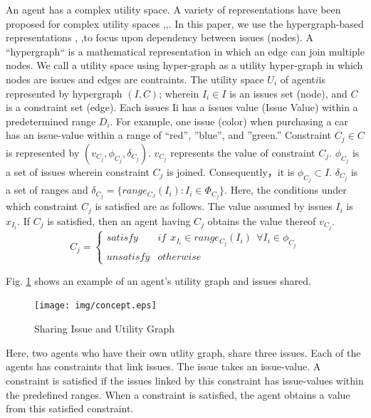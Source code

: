 \documentclass[paper]{ieice}
\begin{document}
An agent has a complex utility space\cite{Ito2007}. A variety of representations have been proposed for complex utility spaces \cite{Robu2005},\cite{robu:08},\cite{Aydogan2015}. In this paper, we use the hypergraph-based representations \cite{rafik:14}, \cite{rafik:14-2},to focus upon dependency between issues (nodes). A ``hypergraph`` is a mathematical representation in which an edge can join multiple nodes. We call a utility space using hyper-graph as a utility hyper-graph in which nodes are issues and edges are contraints. The utility space $U_i$ of agent$i$is represented by hypergraph $(I, C)$; wherein $I_{i}\in I$ is an issues set (node), and $C$ is a constraint set (edge). Each issues Ii has a issues value (Issue Value) within a predetermined range $D_{i}$. For example, one issue (color) when purchasing a car has an issue-value within a range of “red”, ”blue”, and ”green.” Constraint $C_{j}\in C$ is represented by $(v_{C_j},\phi_{C_j}, \delta_{C_j})$.  $v_{C_j}$ represents the value of constraint $C_{j}$. $\phi_{C_j}$ is a set of issues wherein constraint $C_{j}$ is joined. Consequently，it is $\phi_{C_j}\subset I$. $\delta_{C_j}$ is a set of ranges and $\delta_{C_j}=\{range_{C_J}(I_i):I_i\in\Phi_{C_j}\}$. Here, the conditions under which constraint $C_{j}$ is satisfied are as follows. The value assumed by issues $I_i$ is $x_{I_i}$. If $C_{j}$ is satisfied, then an agent having $C_{j}$ obtains the value thereof $v_{C_j}$. 
\begin{equation}
C_{j}=
   \begin{cases}
        satisfy & if\ \ x_{I_i}\in range_{C_j}(I_i)\ \ \forall I_i\in \phi_{C_j}\\
        unsatisfy & otherwise
    \end{cases}
    \nonumber
\end{equation}
 
 
 
 Fig. \ref{fig:Concept} shows an example of an agent's utility graph and issues shared. 
 \begin{figure}[h]
    \centering
    \texttt{[image: img/concept.eps]}
    \caption{Sharing Issue and Utility Graph}
    \label{fig:Concept}
\end{figure}
 
 Here, two agents who have their own utlity graph,  share three issues. Each of the agents has constraints that link issues. The issue takes an issue-value. A constraint is satisfied if the issues linked by this constraint has issue-values within the predefined ranges. When a constraint is satisfied, the agent obtains a value from this satisfied constraint. 
 
\end{document}
